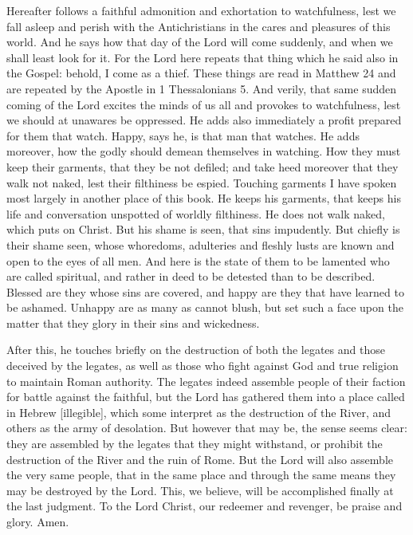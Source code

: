 Hereafter follows a faithful admonition and exhortation to watchfulness, lest we fall asleep and perish with the Antichristians in the cares and pleasures of this world. And he says how that day of the Lord will come suddenly, and when we shall least look for it. For the Lord here repeats that thing which he said also in the Gospel: behold, I come as a thief. These things are read in Matthew 24 and are repeated by the Apostle in 1 Thessalonians 5. And verily, that same sudden coming of the Lord excites the minds of us all and provokes to watchfulness, lest we should at unawares be oppressed. He adds also immediately a profit prepared for them that watch. Happy, says he, is that man that watches. He adds moreover, how the godly should demean themselves in watching. How they must keep their garments, that they be not defiled; and take heed moreover that they walk not naked, lest their filthiness be espied. Touching garments I have spoken most largely in another place of this book. He keeps his garments, that keeps his life and conversation unspotted of worldly filthiness. He does not walk naked, which puts on Christ. But his shame is seen, that sins impudently. But chiefly is their shame seen, whose whoredoms, adulteries and fleshly lusts are known and open to the eyes of all men. And here is the state of them to be lamented who are called spiritual, and rather in deed to be detested than to be described. Blessed are they whose sins are covered, and happy are they that have learned to be ashamed. Unhappy are as many as cannot blush, but set such a face upon the matter that they glory in their sins and wickedness.

After this, he touches briefly on the destruction of both the legates and those deceived by the legates, as well as those who fight against God and true religion to maintain Roman authority. The legates indeed assemble people of their faction for battle against the faithful, but the Lord has gathered them into a place called in Hebrew [illegible], which some interpret as the destruction of the River, and others as the army of desolation. But however that may be, the sense seems clear: they are assembled by the legates that they might withstand, or prohibit the destruction of the River and the ruin of Rome. But the Lord will also assemble the very same people, that in the same place and through the same means they may be destroyed by the Lord. This, we believe, will be accomplished finally at the last judgment. To the Lord Christ, our redeemer and revenger, be praise and glory. Amen.
